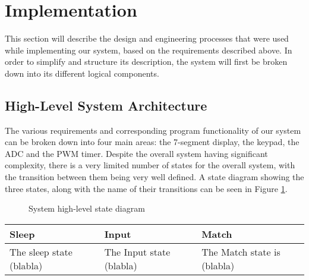 \section{Implementation}

This section will describe the design and engineering processes that were used while implementing our system, based on the requirements described above. In order to simplify and structure its description, the system will first be broken down into its different logical components.


\subsection{High-Level System Architecture}
The various requirements and corresponding program functionality of our system can be broken down into four main areas: the 7-segment display, the keypad, the ADC and the PWM timer. Despite the overall system having significant complexity, there is a very limited number of states for the overall system, with the transition between them being very well defined. A state diagram showing the three states, along with the name of their transitions can be seen in Figure \ref{high_level_state_diagram}.


\begin{figure}[h]
\label{high_level_state_diagram}
\centering
{}
\caption{System high-level state diagram}
\end{figure}




\begin{tabular}{ p{4cm} | p{4cm} | p{4cm}}
Sleep & Input & Match \\
\hline
The sleep state (blabla)
&
The Input state (blabla)

&
The Match state is (blabla)
\\
\end{tabular}


